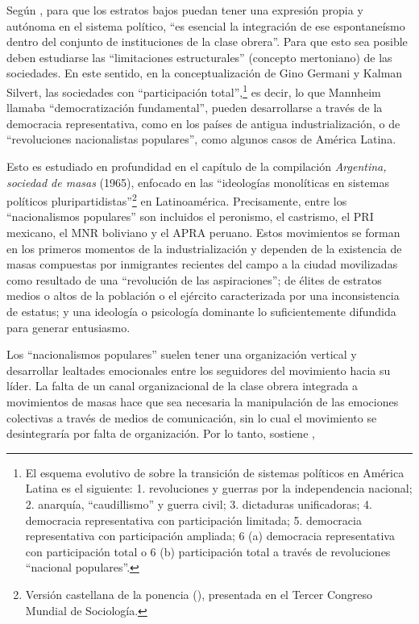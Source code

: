 Según \textcite[64]{1649-DITELLA1964}, para que los estratos bajos puedan tener una expresión propia y autónoma en el sistema político, \enquote{es esencial la integración de ese espontaneísmo dentro del conjunto de instituciones de la clase obrera}. Para que esto sea posible deben estudiarse las \enquote{limitaciones estructurales} (concepto mertoniano) de las sociedades. En este sentido, en la conceptualización de Gino Germani y Kalman Silvert, las sociedades con \enquote{participación total},\footnote{El esquema evolutivo de \textcite{1684-GERMANI1965} sobre la transición de sistemas políticos en América Latina es el siguiente: 1. revoluciones y guerras por la independencia nacional; 2. anarquía, \enquote{caudillismo} y guerra civil; 3. dictaduras unificadoras; 4. democracia representativa con participación limitada; 5. democracia representativa con participación ampliada; 6 (a) democracia representativa con participación total o 6 (b) participación total a través de revoluciones \enquote{nacional populares}.} es decir, lo que Mannheim llamaba \enquote{democratización fundamental}, pueden desarrollarse a través de la democracia representativa, como en los países de antigua industrialización, o de \enquote{revoluciones nacionalistas populares}, como algunos casos de América Latina.

Esto es estudiado en profundidad en el capítulo de la compilación \emph{Argentina, sociedad de masas} (1965), enfocado en las \enquote{ideologías monolíticas en sistemas políticos pluripartidistas}\footnote{Versión castellana de la ponencia  (\citeyear{1661-DITELLA1962}), presentada en el Tercer Congreso Mundial de Sociología.} en Latinoamérica. Precisamente, entre los \enquote{nacionalismos populares} son incluidos el peronismo, el castrismo, el PRI mexicano, el MNR boliviano y el APRA peruano. Estos movimientos se forman en los primeros momentos de la industrialización y dependen de la existencia de masas compuestas por inmigrantes recientes del campo a la ciudad movilizadas como resultado de una \enquote{revolución de las aspiraciones}; de élites de estratos medios o altos de la población o el ejército caracterizada por una inconsistencia de estatus; y una ideología o psicología dominante lo suficientemente difundida para generar entusiasmo.

Los \enquote{nacionalismos populares} suelen tener una organización vertical y desarrollar lealtades emocionales entre los seguidores del movimiento hacia su líder. La falta de un canal organizacional de la clase obrera integrada a movimientos de masas hace que sea necesaria la manipulación de las emociones colectivas a través de medios de comunicación, sin lo cual el movimiento se desintegraría por falta de organización. Por lo tanto, sostiene \textcite[278]{1654-DITELLA1965},

